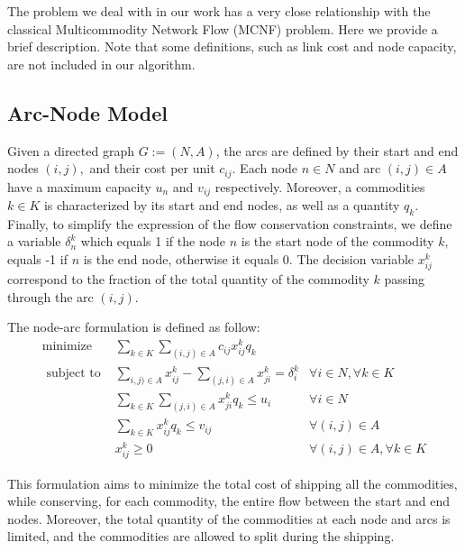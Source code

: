 The problem we deal with in our work has a very close relationship with the classical Multicommodity Network Flow (MCNF) problem. Here we provide a brief description. Note that some definitions, such as link cost and node capacity, are not included in our algorithm.

\subsection{Arc-Node Model}
Given a directed graph $G:=(N, A)$, the arcs are defined by their start and end nodes $(i, j),$ and their cost per unit $c_{i j}$. Each node $n \in N$ and arc $(i, j) \in A$ have a maximum capacity $u_{n}$ and $v_{i j}$ respectively. Moreover, a commodities $k \in K$ is characterized by its start and end nodes, as well as a quantity $q_{k} .$ Finally, to simplify the expression of the flow conservation constraints, we define a variable $\delta_{n}^{k}$ which equals 1 if the node $n$ is the start node of the commodity $k,$ equals -1 if $n$ is the end node, otherwise it equals $0 .$ The decision variable $x_{i j}^{k}$ correspond to the fraction of the total quantity of the commodity $k$ passing through the arc $(i, j)$.

The node-arc formulation is defined as follow:
\begin{equation}\begin{array}{lll}
\operatorname{minimize} & \sum_{k \in K} \sum_{(i, j) \in A} c_{i j} x_{i j}^{k} q_{k} \\
\text { subject to } & \sum_{i, j) \in A} x_{i j}^{k}-\sum_{(j, i) \in A} x_{j i}^{k}=\delta_{i}^{k} & \forall i \in N, \forall k \in K \\
& \sum_{k \in K} \sum_{(j, i) \in A} x_{j i}^{k} q_{k} \leq u_{i} & \forall i \in N \\
& \sum_{k \in K} x_{i j}^{k} q_{k} \leq v_{i j} & \forall(i, j) \in A \\
& x_{i j}^{k} \geq 0 & \forall(i, j) \in A, \forall k \in K
\end{array}\end{equation}

This formulation aims to minimize the total cost of shipping all the commodities, while conserving, for each commodity, the entire flow between the start and
end nodes. Moreover, the total quantity of the commodities at each node and
arcs is limited, and the commodities are allowed to split during the shipping.

